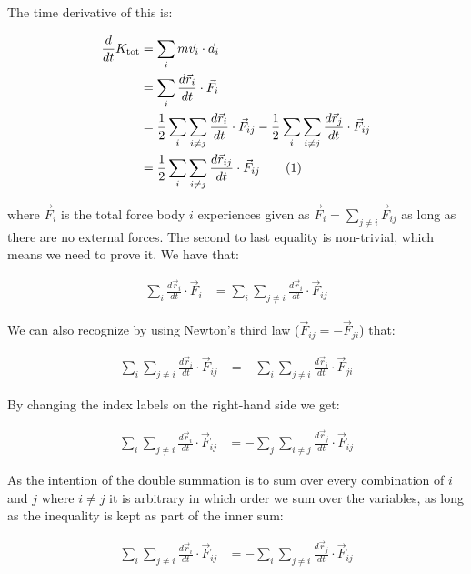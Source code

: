 \documentclass[reprint,english,notitlepage]{revtex4-1}  %
\newcommand\numberthis{\addtocounter{equation}{1}\tag{\theequation}}
\begin{document}
The time derivative of this is:

\begin{align*}
\frac{d}{dt} K_\text{tot} &= \sum\limits_i m \vec{v}_i \cdot \vec{a}_i \\
&= \sum\limits_i \frac{d\vec{r}_i}{dt} \cdot \vec{F}_i \\
&= \frac{1}{2}\sum\limits_i \sum\limits_{i\neq j} \frac{d\vec{r}_i}{dt} \cdot \vec{F}_{ij} - \frac{1}{2}\sum\limits_i \sum\limits_{i\neq j} \frac{d\vec{r}_j}{dt} \cdot \vec{F}_{ij} \\
&= \frac{1}{2}\sum\limits_i \sum\limits_{i\neq j} \frac{d\vec{r}_{ij}}{dt} \cdot \vec{F}_{ij} \numberthis \label{eq:kin_en_der1}
\end{align*}


where $\vec{F}_i$ is the total force body $i$ experiences given as $\vec{F}_i = \sum\limits_{j\neq i} \vec{F}_{ij}$ as long as there are no external forces. The second to last equality is non-trivial, which means we need to prove it. We have that:

\begin{align*}
\sum\limits_i \frac{d\vec{r}_i}{dt} \cdot \vec{F}_i &= \sum\limits_i \sum\limits_{j \neq i} \frac{d\vec{r}_i}{dt} \cdot \vec{F}_{ij} 
\end{align*}

We can also recognize by using Newton's third law ($\vec{F}_{ij} = - \vec{F}_{ji}$) that:

\begin{align*}
\sum\limits_i \sum\limits_{j \neq i} \frac{d\vec{r}_i}{dt} \cdot \vec{F}_{ij} &= -\sum\limits_i \sum\limits_{j \neq i} \frac{d\vec{r}_i}{dt} \cdot \vec{F}_{ji} 
\end{align*}

By changing the index labels on the right-hand side we get:

\begin{align*}
\sum\limits_i \sum\limits_{j \neq i} \frac{d\vec{r}_i}{dt} \cdot \vec{F}_{ij} &= -\sum\limits_j \sum\limits_{i \neq j} \frac{d\vec{r}_j}{dt} \cdot \vec{F}_{ij} 
\end{align*}

As the intention of the double summation is to sum over every combination of $i$ and $j$ where $i\neq j$ it is arbitrary in which order we sum over the variables, as long as the inequality is kept as part of the inner sum:

\begin{align*}
\sum\limits_i \sum\limits_{j \neq i} \frac{d\vec{r}_i}{dt} \cdot \vec{F}_{ij} &= -\sum\limits_i \sum\limits_{j \neq i} \frac{d\vec{r}_j}{dt} \cdot \vec{F}_{ij} 
\end{align*}
\end{document}
